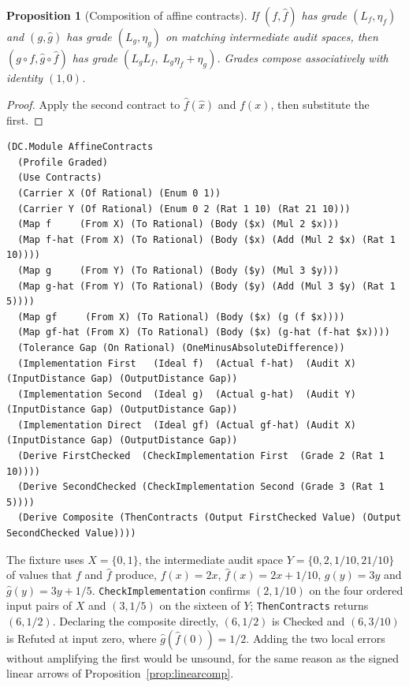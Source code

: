\documentclass[11pt]{article}
\newcommand{\code}[1]{\texttt{#1}}
\theoremstyle{definition}
\theoremstyle{plain}
\newtheorem{proposition}[definition]{Proposition}
\begin{document}
\begin{proposition}[Composition of affine contracts]
If $(f,\hat f)$ has grade $(L_f,\eta_f)$ and $(g,\hat g)$ has grade $(L_g,\eta_g)$ on matching
intermediate audit spaces, then $(g\circ f,\hat g\circ\hat f)$ has grade
$(L_gL_f,\ L_g\eta_f+\eta_g)$. Grades compose associatively with identity $(1,0)$.
\end{proposition}

\begin{proof}
Apply the second contract to $\hat f(\hat x)$ and $f(x)$, then substitute the first.
\end{proof}

\begin{lstlisting}[basicstyle=\ttfamily\footnotesize,title={\scriptsize\ttfamily fixtures/affine\_contracts.metta}]
(DC.Module AffineContracts
  (Profile Graded)
  (Use Contracts)
  (Carrier X (Of Rational) (Enum 0 1))
  (Carrier Y (Of Rational) (Enum 0 2 (Rat 1 10) (Rat 21 10)))
  (Map f     (From X) (To Rational) (Body ($x) (Mul 2 $x)))
  (Map f-hat (From X) (To Rational) (Body ($x) (Add (Mul 2 $x) (Rat 1 10))))
  (Map g     (From Y) (To Rational) (Body ($y) (Mul 3 $y)))
  (Map g-hat (From Y) (To Rational) (Body ($y) (Add (Mul 3 $y) (Rat 1 5))))
  (Map gf     (From X) (To Rational) (Body ($x) (g (f $x))))
  (Map gf-hat (From X) (To Rational) (Body ($x) (g-hat (f-hat $x))))
  (Tolerance Gap (On Rational) (OneMinusAbsoluteDifference))
  (Implementation First   (Ideal f)  (Actual f-hat)  (Audit X) (InputDistance Gap) (OutputDistance Gap))
  (Implementation Second  (Ideal g)  (Actual g-hat)  (Audit Y) (InputDistance Gap) (OutputDistance Gap))
  (Implementation Direct  (Ideal gf) (Actual gf-hat) (Audit X) (InputDistance Gap) (OutputDistance Gap))
  (Derive FirstChecked  (CheckImplementation First  (Grade 2 (Rat 1 10))))
  (Derive SecondChecked (CheckImplementation Second (Grade 3 (Rat 1 5))))
  (Derive Composite (ThenContracts (Output FirstChecked Value) (Output SecondChecked Value))))
\end{lstlisting}

The fixture uses $X=\{0,1\}$, the intermediate audit space $Y=\{0,2,1/10,21/10\}$ of values that
$f$ and $\hat f$ produce, $f(x)=2x$, $\hat f(x)=2x+1/10$, $g(y)=3y$ and $\hat g(y)=3y+1/5$.
\code{CheckImplementation} confirms $(2,1/10)$ on the four ordered input pairs of $X$ and $(3,1/5)$
on the sixteen of $Y$; \code{ThenContracts} returns $(6,1/2)$. Declaring the composite directly,
$(6,1/2)$ is Checked and $(6,3/10)$ is Refuted at input zero, where $\hat g(\hat f(0))=1/2$. Adding
the two local errors without amplifying the first would be unsound, for the same reason as the
signed linear arrows of Proposition~\ref{prop:linearcomp}.
\end{document}
